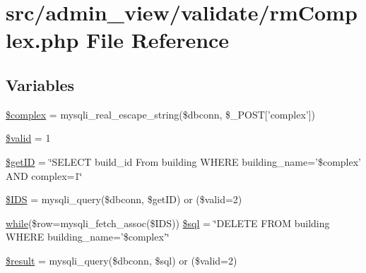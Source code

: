 \hypertarget{rmComplex_8php}{\section{src/admin\-\_\-view/validate/rm\-Complex.php \-File \-Reference}
\label{rmComplex_8php}
}
\subsection*{\-Variables}
\begin{DoxyCompactItemize}
\item 
\hyperlink{rmComplex_8php_a25ec02534214977602829622b78b5d78}{\$complex} = mysqli\-\_\-real\-\_\-escape\-\_\-string(\$dbconn, \$\-\_\-\-P\-O\-S\-T\mbox{[}'complex'\mbox{]})
\item 
\hyperlink{rmComplex_8php_a0587674d27d00ef497e08e53ccf45bbb}{\$valid} = 1
\item 
\hyperlink{rmComplex_8php_aae30003a4d3fab7dc75a19cbfddea7a8}{\$get\-I\-D} = \char`\"{}\-S\-E\-L\-E\-C\-T build\-\_\-id \-From building \-W\-H\-E\-R\-E building\-\_\-name='\$complex' \-A\-N\-D complex=1\char`\"{}
\item 
\hyperlink{rmComplex_8php_a046621a0674ef3c7f611b85c330fe1c5}{\$\-I\-D\-S} = mysqli\-\_\-query(\$dbconn, \$get\-I\-D) or (\$valid=2)
\item 
\hyperlink{studentForm_8php_abeb5d2366a9870820ffb1e260d040d8d}{while}(\$row=mysqli\-\_\-fetch\-\_\-assoc(\$\-I\-D\-S)) \hyperlink{rmComplex_8php_a44dd5051c0321c5bf69d18bbc8cc43c3}{\$sql} = \char`\"{}\-D\-E\-L\-E\-T\-E \-F\-R\-O\-M building \-W\-H\-E\-R\-E building\-\_\-name='\$complex'\char`\"{}
\item 
\hyperlink{rmComplex_8php_a112ef069ddc0454086e3d1e6d8d55d07}{\$result} = mysqli\-\_\-query(\$dbconn, \$sql) or (\$valid=2)
\end{DoxyCompactItemize}


